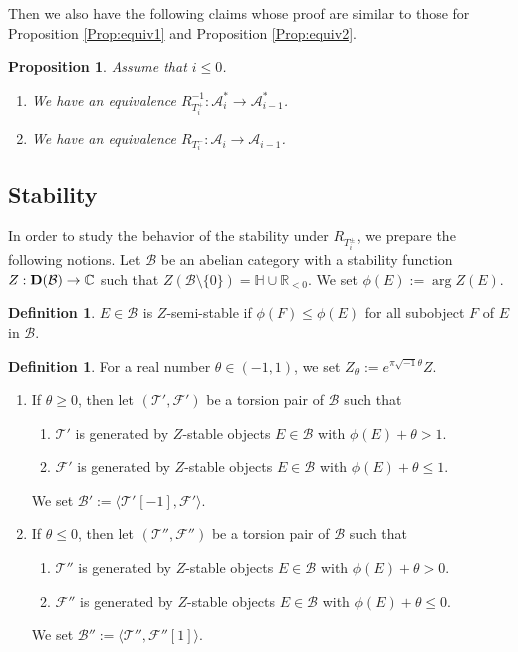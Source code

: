 \documentclass[leqno,11pt]{amsart}
\def\C{\ensuremath{\mathbb{C}}}
\def\H{\ensuremath{\mathbb{H}}}
\def\R{\ensuremath{\mathbb{R}}}
\newtheorem{Prop}[Thm]{Proposition}
\theoremstyle{definition}
\newtheorem{Def}[Thm]{Definition}
\def\C{\ensuremath{\mathbb{C}}}
\def\H{\ensuremath{\mathbb{H}}}
\def\R{\ensuremath{\mathbb{R}}}
\def\AA{\ensuremath{\mathcal A}}
\def\BB{\ensuremath{\mathcal B}}
\def\FF{\ensuremath{\mathcal F}}
\def\TT{\ensuremath{\mathcal T}}
\begin{document}
Then we also have the following claims whose proof are similar to those 
for Proposition \ref{Prop:equiv1} and
Proposition \ref{Prop:equiv2}.
\begin{Prop}\label{Prop:equiv3}
Assume that $i \leq 0$.
\begin{enumerate}
\item[(1)]
We have an equivalence
$R_{T_i^+}^{-1}:\AA_i^* \to \AA_{i-1}^*$.
\item[(2)]
We have an equivalence
$R_{T_i^-}:\AA_i \to \AA_{i-1}$.
\end{enumerate}
\end{Prop}







\subsection{Stability}
In order to study the behavior of the stability under $R_{T_i^\pm}$,
we prepare the following notions. 
Let $\BB$ be an abelian category with a  
stability function $Z:{\bf D}(\BB) \to \C$ such that
$Z(\BB \setminus \{0 \})= \H \cup \R_{<0}$. 
We set $\phi(E):=\arg Z(E)$.
\begin{Def}
$E \in \BB$ is $Z$-semi-stable if
$\phi(F) \leq \phi(E)$ for all subobject $F$ of $E$
in $\BB$.
\end{Def}

\begin{Def}\label{defn:B'}
For a real number $\theta \in (-1,1)$, 
we set $Z_\theta:=e^{\pi \sqrt{-1} \theta} Z$.
\begin{enumerate}
\item[(1)]
If $\theta \geq 0$, then
let $(\TT',\FF')$ be a torsion pair of $\BB$
such that
\begin{enumerate}
\item
$\TT'$ is generated by $Z$-stable objects $E \in \BB$ with
$\phi(E)+\theta>1$. 
\item
$\FF'$ is generated by $Z$-stable objects $E \in \BB$ with
$\phi(E)+\theta \leq 1$. 
\end{enumerate}
We set $\BB':=\langle \TT'[-1],\FF' \rangle$.
\item[(2)]
If $\theta \leq 0$, then
let $(\TT'',\FF'')$ be a torsion pair of $\BB$
such that
\begin{enumerate}
\item
$\TT''$ is generated by $Z$-stable objects $E \in \BB$ with
$\phi(E)+\theta>0$. 
\item
$\FF''$ is generated by $Z$-stable objects $E \in \BB$ with
$\phi(E)+\theta \leq 0$. 
\end{enumerate}
We set $\BB'':=\langle \TT'',\FF''[1] \rangle$.
\end{enumerate}
\end{Def}
\end{document}
